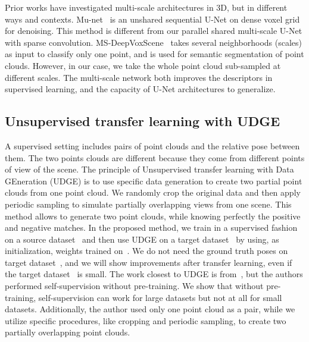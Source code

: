 \documentclass[10pt,twocolumn,letterpaper]{article}
\begin{document}
Prior works have investigated multi-scale architectures in 3D, but in different ways and contexts. Mu-net~\cite{munet} is an unshared sequential U-Net on dense voxel grid for denoising. This method is different from our parallel shared multi-scale U-Net with sparse convolution.
MS-DeepVoxScene~\cite{roynard2018multiscale} takes several neighborhoods (scales) as input to classify only one point, and is used for semantic segmentation of point clouds.
However, in our case, we take the whole point cloud sub-sampled at different scales. The multi-scale network both improves the descriptors in supervised learning, and the capacity of U-Net architectures to generalize.







\subsection{Unsupervised transfer learning with UDGE}
A supervised setting includes pairs of point clouds and the relative pose between them. The two points clouds are different because they come from different points of view of the scene. The principle of Unsupervised transfer learning with Data GEneration (UDGE) is to use specific data generation to create two partial point clouds from one point cloud. We randomly crop the original data and then apply periodic sampling to simulate partially overlapping views from one scene. This method allows to generate two point clouds, while knowing perfectly the positive and negative matches. 
In the proposed method, we train in a supervised fashion on a source dataset~ and then use UDGE on a target dataset~ by using, as initialization, weights trained on~. We do not need the ground truth poses on target dataset~, and we will show improvements after transfer learning, even if the target dataset~ is small.
The work closest to UDGE is from~\cite{yuan2020selfsupervised}, but the authors performed self-supervision without pre-training. We show that without pre-training, self-supervision can work for large datasets but not at all for small datasets. 
Additionally, the author used only one point cloud as a pair, while we utilize specific procedures, like cropping and periodic sampling, to create two partially overlapping point clouds.
\end{document}
